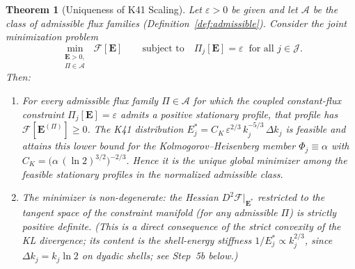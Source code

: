 \documentclass[12pt,a4paper]{article}
\theoremstyle{breakdef}
\theoremstyle{breakplain}
\newtheorem{theorem}[definition]{Theorem}
\theoremstyle{breakdef}
\begin{document}
\begin{theorem}[Uniqueness of K41 Scaling]\label{thm:K41}
Let $\varepsilon > 0$ be given and let $\mathscr{A}$ be the class of
admissible flux families (Definition~\ref{def:admissible}).
Consider the \emph{joint} minimization problem
\begin{equation}\label{eq:min}
  \min_{\substack{\mathbf{E} > 0,\\ \Pi \in \mathscr{A}}}
  \;\mathcal{F}[\mathbf{E}]
  \qquad \text{subject to} \quad
  \Pi_j[\mathbf{E}] = \varepsilon
  \;\;\text{for all } j \in \mathcal{J}.
\end{equation}
Then:
\begin{enumerate}
  \item[\textup{(i)}]
    For every admissible flux family $\Pi \in \mathscr{A}$ for which the
    coupled constant-flux constraint $\Pi_j[\mathbf{E}] = \varepsilon$
    admits a positive stationary profile, that profile has
    $\mathcal{F}[\mathbf{E}^{(\Pi)}]\ge0$.  The K41 distribution
    $E_j^* = C_K\,\varepsilon^{2/3}\,k_j^{-5/3}\,\Delta k_j$
    is feasible and attains this lower bound for the
    Kolmogorov--Heisenberg member $\Phi_j \equiv \alpha$ with
    $C_K = \bigl(\alpha\,(\ln 2)^{3/2}\bigr)^{-2/3}$.  Hence it is the
    unique global minimizer among the feasible stationary profiles in the
    normalized admissible class.
  \item[\textup{(ii)}]
    The minimizer is non-degenerate: the Hessian
    $D^2\mathcal{F}|_{\mathbf{E}^*}$ restricted to the tangent space of
    the constraint manifold (for any admissible $\Pi$) is strictly positive
    definite. (This is a direct consequence of the strict convexity of
    the KL divergence; its content is the shell-energy stiffness
    $1/E_j^* \propto k_j^{2/3}$, since
    $\Delta k_j = k_j\ln2$ on dyadic shells; see Step~5b below.)
\end{enumerate}
\end{theorem}
\end{document}

